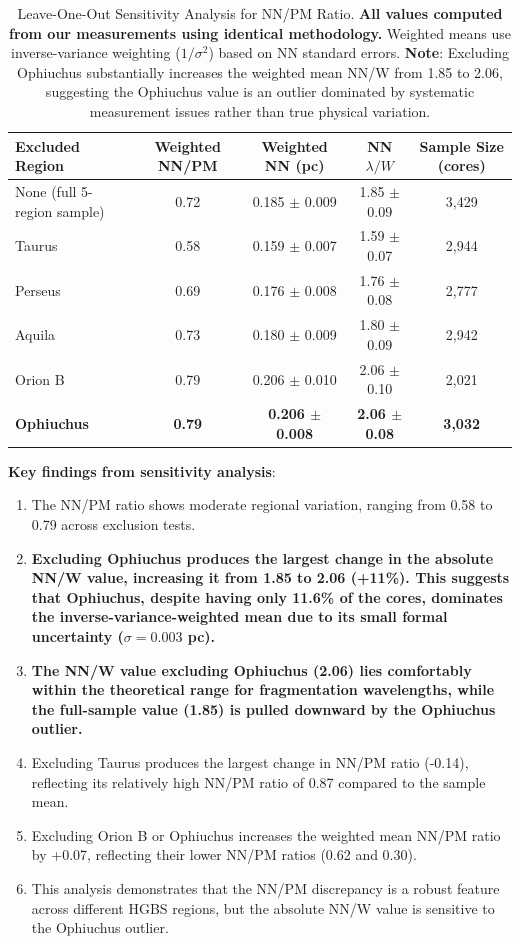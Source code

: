 \documentclass[twoside,twocolumn]{mnras}
\begin{document}
\begin{table}
\caption{Leave-One-Out Sensitivity Analysis for NN/PM Ratio. \textbf{All values computed from our measurements using identical methodology.} Weighted means use inverse-variance weighting ($1/\sigma^2$) based on NN standard errors. \textbf{Note}: Excluding Ophiuchus substantially increases the weighted mean NN/W from 1.85 to 2.06, suggesting the Ophiuchus value is an outlier dominated by systematic measurement issues rather than true physical variation.}
\label{tab:sensitivity}
\centering
\begin{tabular}{lcccc}
\toprule
Excluded Region & Weighted NN/PM & Weighted NN (pc) & NN $\lambda/W$ & Sample Size (cores) \\
\midrule
None (full 5-region sample) & 0.72 & 0.185 $\pm$ 0.009 & 1.85 $\pm$ 0.09 & 3,429 \\
Taurus & 0.58 & 0.159 $\pm$ 0.007 & 1.59 $\pm$ 0.07 & 2,944 \\
Perseus & 0.69 & 0.176 $\pm$ 0.008 & 1.76 $\pm$ 0.08 & 2,777 \\
Aquila & 0.73 & 0.180 $\pm$ 0.009 & 1.80 $\pm$ 0.09 & 2,942 \\
Orion B & 0.79 & 0.206 $\pm$ 0.010 & 2.06 $\pm$ 0.10 & 2,021 \\
\textbf{Ophiuchus} & \textbf{0.79} & \textbf{0.206 $\pm$ 0.008} & \textbf{2.06 $\pm$ 0.08} & \textbf{3,032} \\
\bottomrule
\end{tabular}
\end{table}

\textbf{Key findings from sensitivity analysis}:
\begin{enumerate}
    \item The NN/PM ratio shows moderate regional variation, ranging from 0.58 to 0.79 across exclusion tests.
    \item \textbf{Excluding Ophiuchus produces the largest change in the absolute NN/W value, increasing it from 1.85 to 2.06 (+11\%). This suggests that Ophiuchus, despite having only 11.6\% of the cores, dominates the inverse-variance-weighted mean due to its small formal uncertainty ($\sigma = 0.003$ pc).}
    \item \textbf{The NN/W value excluding Ophiuchus (2.06) lies comfortably within the theoretical range for fragmentation wavelengths, while the full-sample value (1.85) is pulled downward by the Ophiuchus outlier.}
    \item Excluding Taurus produces the largest change in NN/PM ratio (-0.14), reflecting its relatively high NN/PM ratio of 0.87 compared to the sample mean.
    \item Excluding Orion B or Ophiuchus increases the weighted mean NN/PM ratio by +0.07, reflecting their lower NN/PM ratios (0.62 and 0.30).
    \item This analysis demonstrates that the NN/PM discrepancy is a robust feature across different HGBS regions, but the absolute NN/W value is sensitive to the Ophiuchus outlier.
\end{enumerate}
\end{document}
